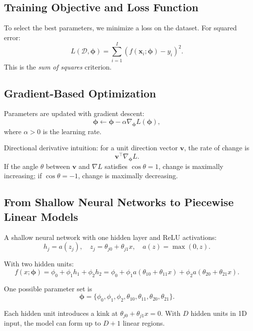 \subsection{Training Objective and Loss Function}
To select the best parameters, we minimize a loss on the dataset.
For squared error:
\[
L(\mathcal{D},\boldsymbol{\phi}) =
\sum_{i=1}^{I}\left(f(\mathbf{x}_i;\boldsymbol{\phi}) - y_i\right)^2.
\]
This is the \emph{sum of squares} criterion.

\subsection{Gradient-Based Optimization}
Parameters are updated with gradient descent:
\[
\boldsymbol{\phi} \leftarrow \boldsymbol{\phi} - \alpha \nabla_{\boldsymbol{\phi}}L(\boldsymbol{\phi}),
\]
where $\alpha > 0$ is the learning rate.

Directional derivative intuition:
for a unit direction vector $\mathbf{v}$, the rate of change is
\[
\mathbf{v}^{\top}\nabla_{\boldsymbol{\phi}}L.
\]
If the angle $\theta$ between $\mathbf{v}$ and $\nabla L$ satisfies
$\cos\theta=1$, change is maximally increasing; if $\cos\theta=-1$, change is
maximally decreasing.

\subsection{From Shallow Neural Networks to Piecewise Linear Models}
A shallow neural network with one hidden layer and ReLU activations:
\[
h_j = a(z_j), \quad z_j = \theta_{j0}+\theta_{j1}x,\quad
a(z)=\max(0,z).
\]

With two hidden units:
\[
f(x;\boldsymbol{\phi}) = \phi_0 + \phi_1 h_1 + \phi_2 h_2
= \phi_0 + \phi_1 a(\theta_{10}+\theta_{11}x) + \phi_2 a(\theta_{20}+\theta_{21}x).
\]

One possible parameter set is
\[
\boldsymbol{\phi}=
\{\phi_0,\phi_1,\phi_2,\theta_{10},\theta_{11},\theta_{20},\theta_{21}\}.
\]

Each hidden unit introduces a kink at $\theta_{j0}+\theta_{j1}x=0$.
With $D$ hidden units in 1D input, the model can form up to $D+1$ linear regions.

\newpage

